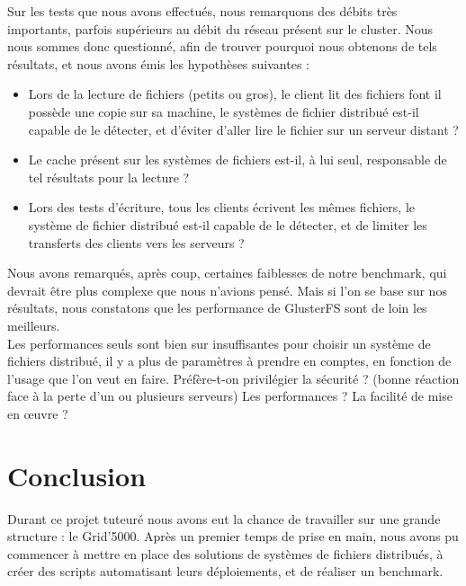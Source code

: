 \documentclass[12pt]{report}
\begin{document}
			Sur les tests que nous avons effectués, nous remarquons des débits très importants, parfois supérieurs au débit du réseau présent sur le cluster.
			Nous nous sommes donc questionné, afin de trouver pourquoi nous obtenons de tels résultats, et nous avons émis les hypothèses suivantes :
			\begin{itemize}
				\item Lors de la lecture de fichiers (petits ou gros), le client lit des fichiers font il possède une copie sur sa machine,
				le systèmes de fichier distribué est-il capable de le détecter, et d'éviter d'aller lire le fichier sur un serveur distant ?
				\item Le cache présent sur les systèmes de fichiers est-il, à lui seul, responsable de tel résultats pour la lecture ?
				\item Lors des tests d'écriture, tous les clients écrivent les mêmes fichiers, le système de fichier distribué est-il capable de le détecter,
				et de limiter les transferts des clients vers les serveurs ?\\
			\end{itemize}

			Nous avons remarqués, après coup, certaines faiblesses de notre benchmark, qui devrait être plus complexe que nous n'avions pensé.
			Mais si l'on se base sur nos résultats, nous constatons que les performance de GlusterFS sont de loin les meilleurs.\\

			Les performances seuls sont bien sur insuffisantes pour choisir un système de fichiers distribué, il y a plus de paramètres à prendre en comptes,
			en fonction de l'usage que l'on veut en faire. Préfère-t-on privilégier la sécurité ? (bonne réaction face à la perte d'un ou plusieurs serveurs)
			Les performances ? La facilité de mise en œuvre ?

	\chapter{Conclusion}

	Durant ce projet tuteuré nous avons eut la chance de travailler sur une grande structure : le Grid'5000.
	Après un premier temps de prise en main, nous avons pu commencer à mettre en place des solutions de systèmes de fichiers distribués,
	à créer des scripts automatisant leurs déploiements, et de réaliser un benchmark.\\
\end{document}
